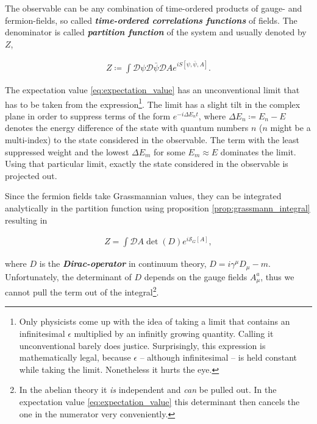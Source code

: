 \documentclass{article}
\theoremstyle{plain} %
\theoremstyle{convention} %
\theoremstyle{remark} %
\def\df#1{\textbf{\textit{#1}}}
\numberwithin{equation}{section}
\begin{document}
The observable can be any combination of time-ordered products of gauge- and fermion-fields, so called \df{time-ordered correlations functions} of fields. The denominator is called \df{partition function} of the system and usually denoted by $Z$,

\begin{align*}
    Z \coloneqq \int \mathcal{D}\psi \mathcal{D} \bar{\psi} \mathcal{D} A e^{iS[\psi, \bar{\psi}, A]}.
\end{align*}

The expectation value \eqref{eq:expectation_value} has an unconventional limit that has to be taken from the expression\footnote{Only physicists come up with the idea of taking a limit that contains an infinitesimal $\epsilon$ multiplied by an infinitly growing quantity. Calling it unconventional barely does justice. Surprisingly, this expression is mathematically legal, because $\epsilon$ -- although infinitesimal -- is held constant while taking the limit. Nonetheless it hurts the eye.}. The limit has a slight tilt in the complex plane in order to suppress terms of the form $e^{-i \Delta E_n t}$, where $\Delta E_n \coloneqq E_n - E$ denotes the energy difference of the state with quantum numbers $n$ ($n$ might be a multi-index) to the state considered in the observable. The term with the least suppressed weight and the lowest $\Delta E_m$ for some $E_m \approx E$ dominates the limit. Using that particular limit, exactly the state considered in the observable is projected out.

Since the fermion fields take Grassmannian values, they can be integrated analytically in the partition function using proposition \ref{prop:grassmann_integral} resulting in

\begin{align*}
    Z = \int \mathcal{D} A \det(D) e^{i\mathcal{S}_{G}[A]},
\end{align*}

where $D$ is the \df{Dirac-operator} in continuum theory, $D = i\gamma^{\mu} D_{\mu} - m$. Unfortunately, the determinant of $D$ depends on the gauge fields $A_{\mu}^a$, thus we cannot pull the term out of the integral\footnote{In the abelian theory it \textit{is} independent and \textit{can} be pulled out. In the expectation value \eqref{eq:expectation_value} this determinant then cancels the one in the numerator very conveniently.}.

\end{document}

